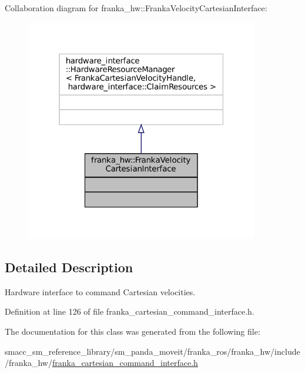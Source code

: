 Collaboration diagram for franka\+\_\+hw\+:\+:Franka\+Velocity\+Cartesian\+Interface\+:
\nopagebreak
\begin{figure}[H]
\begin{center}
\leavevmode
\includegraphics[width=289pt]{classfranka__hw_1_1FrankaVelocityCartesianInterface__coll__graph}
\end{center}
\end{figure}


\subsection{Detailed Description}
Hardware interface to command Cartesian velocities. 

Definition at line 126 of file franka\+\_\+cartesian\+\_\+command\+\_\+interface.\+h.



The documentation for this class was generated from the following file\+:\begin{DoxyCompactItemize}
\item 
smacc\+\_\+sm\+\_\+reference\+\_\+library/sm\+\_\+panda\+\_\+moveit/franka\+\_\+ros/franka\+\_\+hw/include/franka\+\_\+hw/\hyperlink{franka__cartesian__command__interface_8h}{franka\+\_\+cartesian\+\_\+command\+\_\+interface.\+h}\end{DoxyCompactItemize}
